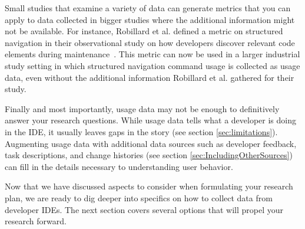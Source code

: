 Small studies that examine a variety of data can generate metrics that you can apply to data collected in bigger studies where the additional information might not be available. 
        For instance, Robillard et al. defined a metric on structured navigation in their observational study on how developers discover relevant code elements during maintenance~\cite{wbsnipes:Robillard2004How}. This metric can now be used in a larger industrial study setting in which structured navigation command usage is collected as usage data, even without the additional information Robillard et al. gathered for their study.

Finally and most importantly, usage data may not be enough to definitively answer your research questions. While usage data tells what a developer is doing in the IDE, it usually leaves gaps in the story (see section \ref{sec:limitations}).  Augmenting usage data with additional data sources such as developer feedback, task descriptions, and change histories (see section \ref{sec:IncludingOtherSources}) can fill in the details necessary to understanding user behavior.

\vspace{0.1in}

Now that we have discussed aspects to consider when formulating your research plan, we are ready to dig deeper into specifics on how to collect data from developer IDEs.  The next section covers several options that will propel your research forward.


